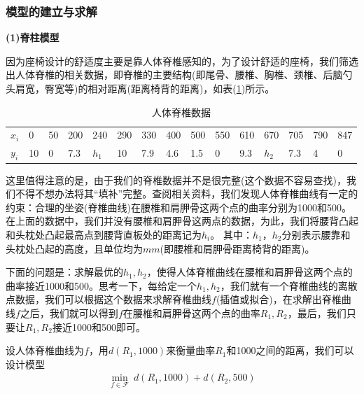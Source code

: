         \subsubsection{模型的建立与求解}
            \par
            \textbf{(1)脊柱模型}
            \par
            因为座椅设计的舒适度主要是靠人体脊椎感知的，为了设计舒适的座椅，我们筛选出人体脊椎的相关数据，即脊椎的主要结构(即尾骨、腰椎、胸椎、颈椎、后脑勺头肩宽，臀宽等)的相对距离(距离椅背的距离)，如表(\ref{人体脊椎数据})所示。
            \begin{table}[H]
            \centering
            \caption{人体脊椎数据}
            \label{人体脊椎数据}
            \begin{tabular}{l|llllllllllllll}%
                \toprule
                $x_i$  &0 &  50 & 200& 240& 290& 330& 400& 500& 550& 610 & 670& 705&  790& 847\\
                $y_i$ &10&  0  & 7.3& $h_1$ & 10 & 7.9& 4.6& 1.5& 0  & 9.3 & $h_2$ & 7.3&  4  & 0\\
            \bottomrule
            \end{tabular}
            \end{table}
            \par
            这里值得注意的是，由于我们的脊椎数据并不是很完整(这个数据不容易查找)，我们不得不想办法将其“填补”完整。查阅相关资料，我们发现人体脊椎曲线有一定的约束：合理的坐姿(脊椎曲线)在腰椎和肩胛骨这两个点的曲率分别为1000和500。在上面的数据中，我们并没有腰椎和肩胛骨这两点的数据，为此，我们将腰背凸起和头枕处凸起最高点到腰背直板处的距离记为$h_i$。
            其中：$h_1$，$h_2$分别表示腰靠和头枕处凸起的高度，且单位均为$mm$(即腰椎和肩胛骨距离椅背的距离)。
            \par
            下面的问题是：求解最优的$h_1,h_2$，使得人体脊椎曲线在腰椎和肩胛骨这两个点的曲率接近1000和500。思考一下，每给定一个$h_1,h_2$，我们就有一个脊椎曲线的离散点数据，我们可以根据这个数据来求解脊椎曲线$f$(插值或拟合)，在求解出脊椎曲线$f$之后，我们就可以得到$f$在腰椎和肩胛骨这两个点的曲率$R_1,R_2$，最后，我们只要让$R_1,R_2$接近1000和500即可。
            \par
            设人体脊椎曲线为$f$，用$d(R_1,1000)$来衡量曲率$R_1$和1000之间的距离，我们可以设计模型
            \begin{align*}
            \min_{f\in \mathcal{F}} \ d(R_1,1000)+d(R_2,500)
            \end{align*}
